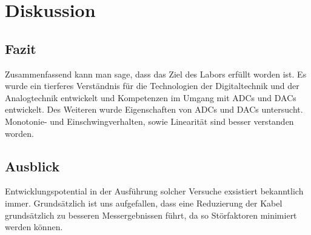 \chapter{Diskussion}
\section{Fazit}
Zusammenfassend kann man sage, dass das Ziel des Labors
erfüllt worden ist. Es wurde ein tierferes Verständnis für
die Technologien der Digitaltechnik und der Analogtechnik
entwickelt und Kompetenzen im Umgang mit ADCs und DACs entwickelt.
Des Weiteren wurde Eigenschaften von ADCs und DACs untersucht.
Monotonie- und Einschwingverhalten, sowie Linearität
sind besser verstanden worden.

\section{Ausblick}

Entwicklungspotential in der Ausführung solcher Versuche exsistiert
bekanntlich immer. Grundsätzlich ist uns aufgefallen, dass
eine Reduzierung der Kabel grundsätzlich zu besseren Messergebnissen
führt, da so Störfaktoren minimiert werden können.